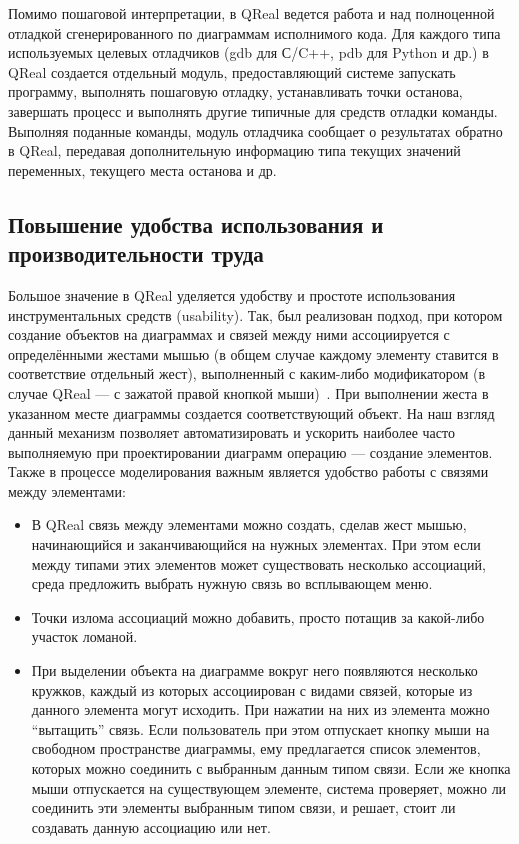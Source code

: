 \documentclass[a4paper]{article}
\begin{document}
Помимо пошаговой интерпретации, в QReal ведется работа и над полноценной отладкой сгенерированного по диаграммам исполнимого кода. Для каждого типа используемых целевых отладчиков (gdb для С/C++, pdb для Python и др.) в QReal создается отдельный модуль, предоставляющий системе запускать программу, выполнять пошаговую отладку, устанавливать точки останова, завершать процесс и выполнять другие типичные для средств отладки команды. Выполняя поданные команды, модуль отладчика сообщает о результатах обратно в QReal, передавая дополнительную информацию типа текущих значений переменных, текущего места останова и др. 
  
\subsection*{Повышение удобства использования и производительности труда}

Большое значение в QReal уделяется удобству и простоте использования инструментальных средств (usability). Так, был реализован подход, при котором создание объектов на диаграммах и связей между ними ассоциируется с определёнными жестами мышью (в общем случае каждому элементу ставится в соответствие отдельный жест), выполненный с каким-либо модификатором (в случае QReal --- с зажатой правой кнопкой мыши)~\cite{mousegestures}. При выполнении жеста в указанном месте диаграммы создается соответствующий объект. На наш взгляд данный механизм позволяет автоматизировать и ускорить наиболее часто выполняемую при проектировании диаграмм операцию --- создание элементов. Также в процессе моделирования важным является удобство работы с связями между элементами:
\begin{itemize} 
  \item В QReal связь между элементами можно создать, сделав жест мышью, начинающийся и заканчивающийся на нужных элементах. При этом если между типами этих элементов может существовать несколько ассоциаций, среда предложить выбрать нужную связь во всплывающем меню. 
  \item Точки излома ассоциаций можно добавить, просто потащив за какой-либо участок ломаной. 
  \item При выделении объекта на диаграмме вокруг него появляются несколько кружков, каждый из которых ассоциирован с видами связей, которые из данного элемента могут исходить. При нажатии на них из элемента можно “вытащить” связь. Если пользователь при этом отпускает кнопку мыши на свободном пространстве диаграммы, ему предлагается список элементов, которых можно соединить с выбранным данным типом связи. Если же кнопка мыши отпускается на существующем элементе, система проверяет, можно ли соединить эти элементы выбранным типом связи, и решает, стоит ли создавать данную ассоциацию или нет. 
\end{itemize}
\end{document}
